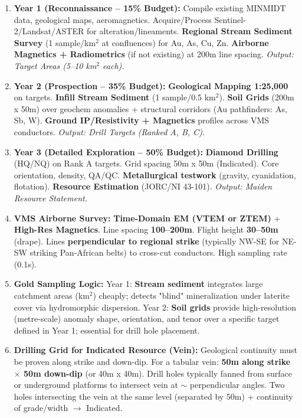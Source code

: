\documentclass[11pt]{article}
\begin{document}
\begin{corrige}
\begin{enumerate}
\item \textbf{Year 1 (Reconnaissance -- 15\% Budget):} Compile existing MINMIDT data, geological maps, aeromagnetics. Acquire/Process Sentinel-2/Landsat/ASTER for alteration/lineaments. \textbf{Regional Stream Sediment Survey} (1 sample/km$^2$ at confluences) for Au, As, Cu, Zn. \textbf{Airborne Magnetics + Radiometrics} (if not existing) at 200m line spacing. \textit{Output: Target Areas (5--10 km$^2$ each).}
\item \textbf{Year 2 (Prospection -- 35\% Budget):} \textbf{Geological Mapping 1:25,000} on targets. \textbf{Infill Stream Sediment} (1 sample/0.5 km$^2$). \textbf{Soil Grids} (200m x 50m) over geochem anomalies + structural corridors (Au pathfinders: As, Sb, W). \textbf{Ground IP/Resistivity + Magnetics} profiles across VMS conductors. \textit{Output: Drill Targets (Ranked A, B, C).}
\item \textbf{Year 3 (Detailed Exploration -- 50\% Budget):} \textbf{Diamond Drilling} (HQ/NQ) on Rank A targets. Grid spacing 50m x 50m (Indicated). Core orientation, density, QA/QC. \textbf{Metallurgical testwork} (gravity, cyanidation, flotation). \textbf{Resource Estimation} (JORC/NI 43-101). \textit{Output: Maiden Resource Statement.}
\item \textbf{VMS Airborne Survey:} \textbf{Time-Domain EM (VTEM or ZTEM)} + \textbf{High-Res Magnetics}. Line spacing \textbf{100--200m}. Flight height \textbf{30--50m} (drape). Lines \textbf{perpendicular to regional strike} (typically NW-SE for NE-SW striking Pan-African belts) to cross-cut conductors. High sampling rate (0.1s).
\item \textbf{Gold Sampling Logic:} Year 1: \textbf{Stream sediment} integrates large catchment areas (km$^2$) cheaply; detects "blind" mineralization under laterite cover via hydromorphic dispersion. Year 2: \textbf{Soil grids} provide high-resolution (metre-scale) anomaly shape, orientation, and tenor over a specific target defined in Year 1; essential for drill hole placement.
\item \textbf{Drilling Grid for Indicated Resource (Vein):} Geological continuity must be proven along strike and down-dip. For a tabular vein: \textbf{50m along strike $\times$ 50m down-dip} (or 40m x 40m). Drill holes typically fanned from surface or underground platforms to intersect vein at $\sim$ perpendicular angles. Two holes intersecting the vein at the same level (separated by 50m) + continuity of grade/width $\to$ Indicated.
\end{enumerate}
\end{corrige}
\end{document}
